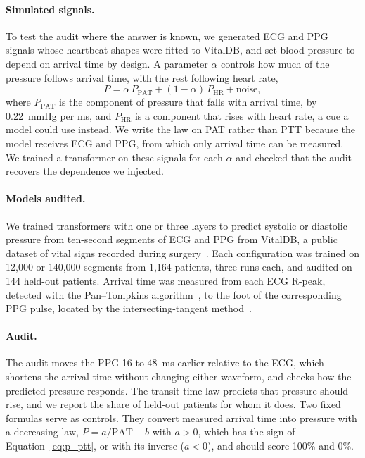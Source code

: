 \paragraph{Simulated signals.} To test the audit where the answer is known, we generated ECG and PPG signals whose heartbeat shapes were fitted to VitalDB, and set blood pressure to depend on arrival time by design. A parameter $\alpha$ controls how much of the pressure follows arrival time, with the rest following heart rate,
\begin{equation}
  P = \alpha\,P_{\mathrm{PAT}} + (1-\alpha)\,P_{\mathrm{HR}} + \text{noise},
  \label{eq:sim}
\end{equation}
where $P_{\mathrm{PAT}}$ is the component of pressure that falls with arrival time, by 0.22~mmHg per ms, and $P_{\mathrm{HR}}$ is a component that rises with heart rate, a cue a model could use instead. We write the law on PAT rather than PTT because the model receives ECG and PPG, from which only arrival time can be measured. We trained a transformer on these signals for each $\alpha$ and checked that the audit recovers the dependence we injected.

\paragraph{Models audited.} We trained transformers with one or three layers to predict systolic or diastolic pressure from ten-second segments of ECG and PPG from VitalDB, a public dataset of vital signs recorded during surgery~\cite{lee2022vitaldb}. Each configuration was trained on 12,000 or 140,000 segments from 1,164 patients, three runs each, and audited on 144 held-out patients. Arrival time was measured from each ECG R-peak, detected with the Pan--Tompkins algorithm~\citep{pan1985realtime}, to the foot of the corresponding PPG pulse, located by the intersecting-tangent method~\citep{chiu1991determination}.

\paragraph{Audit.} The audit moves the PPG 16 to 48~ms earlier relative to the ECG, which shortens the arrival time without changing either waveform, and checks how the predicted pressure responds. The transit-time law predicts that pressure should rise, and we report the share of held-out patients for whom it does. Two fixed formulas serve as controls. They convert measured arrival time into pressure with a decreasing law, $P = a/\mathrm{PAT} + b$ with $a>0$, which has the sign of Equation~\eqref{eq:p_ptt}, or with its inverse ($a<0$), and should score 100\% and 0\%.


